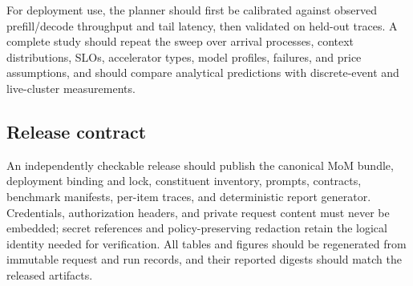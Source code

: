 For deployment use, the planner should first be calibrated against observed
prefill/decode throughput and tail latency, then validated on held-out traces.
A complete study should repeat the sweep over arrival processes, context
distributions, SLOs, accelerator types, model profiles, failures, and price
assumptions, and should compare analytical predictions with discrete-event and
live-cluster measurements.

\subsection{Release contract}

An independently checkable release should publish the canonical MoM bundle,
deployment binding and lock, constituent inventory, prompts, contracts,
benchmark manifests, per-item traces, and deterministic report generator.
Credentials, authorization headers, and private request content must never be
embedded; secret references and policy-preserving redaction retain the logical
identity needed for verification.  All tables and figures should be regenerated
from immutable request and run records, and their reported digests should match
the released artifacts.
\endgroup

